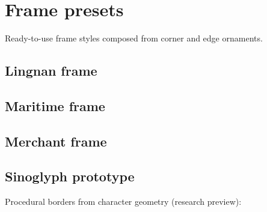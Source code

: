 \chapter{Frame presets}

Ready-to-use frame styles composed from corner and edge ornaments.

\section{Lingnan frame}

\begin{center}
\end{center}

\section{Maritime frame}

\begin{center}
\end{center}

\section{Merchant frame}

\begin{center}
\end{center}

\section{Sinoglyph prototype}

Procedural borders from character geometry (research preview):

\begin{center}
\end{center}
